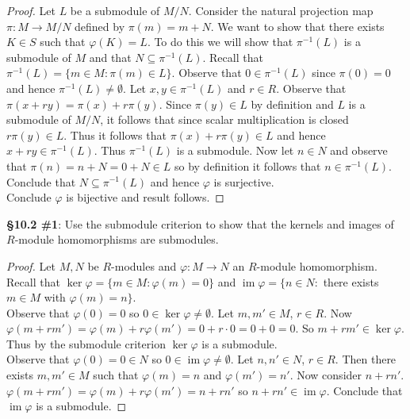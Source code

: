 \documentclass[8pt]{amsart}
\theoremstyle{plain}%
\theoremstyle{definition}
\theoremstyle{remark}
\numberwithin{equation}{section}
\newcommand{\im}{\operatorname{im}}
\begin{document}
\begin{enumerate}
\begin{proof}
				Let $L$ be a submodule of $M/N$. Consider the natural projection map $\pi : M \to M/N$ defined by $\pi(m) = m + N$. We want to show that there exists $K \in S$ such that $\varphi(K) = L$. To do this we will show that $\pi^{-1}(L)$ is a submodule of $M$ and that $N \subseteq \pi^{-1}(L)$. Recall that $\pi^{-1}(L) = \{m \in M : \pi(m) \in L\}$. Observe that $0 \in \pi^{-1}(L)$ since $\pi(0) = 0$ and hence $\pi^{-1}(L) \neq \emptyset$. Let $x, y \in \pi^{-1}(L)$ and $r \in R$. Observe that $\pi(x + ry) = \pi(x) + r \pi(y)$. Since $\pi(y) \in L$ by definition and $L$ is a submodule of $M/N$, it follows that since scalar multiplication is closed $r\pi(y) \in L$. Thus it follows that $\pi(x) + r \pi(y) \in L$ and hence $x + ry \in \pi^{-1}(L)$. Thus $\pi^{-1}(L)$ is a submodule. Now let $n \in N$ and observe that $\pi(n) = n + N = 0 + N \in L$ so by definition it follows that $n \in \pi^{-1}(L)$. Conclude that $N \subseteq \pi^{-1}(L)$ and hence $\varphi$ is surjective.\\

				Conclude $\varphi$ is bijective and result follows.
			\end{proof}
	\end{enumerate}



\textbf{\S 10.2 \#1}: Use the submodule criterion to show that the kernels and images of $R$-module homomorphisms are submodules.
	\begin{proof}
		Let $M, N$ be $R$-modules and $\varphi : M \to N$ an $R$-module homomorphism. Recall that $\ker \varphi = \{m \in M : \varphi(m) = 0\}$ and $\im \varphi = \{n \in N : $ there exists $m \in M$ with $\varphi(m) = n\}$.\\

		Observe that $\varphi(0) = 0$ so $0 \in \ker \varphi \neq \emptyset$. Let $m, m' \in M$, $r \in R$. Now $\varphi(m + rm') = \varphi(m) + r\varphi(m') = 0 + r \cdot 0 = 0 + 0 = 0$. So $m + rm' \in \ker \varphi$. Thus by the submodule criterion $\ker \varphi$ is a submodule.\\

		Observe that $\varphi(0) = 0 \in N$ so $0 \in \im \varphi \neq \emptyset$. Let $n, n' \in N$, $r \in R$. Then there exists $m, m' \in M$ such that $\varphi(m) = n$ and $\varphi(m') = n'$. Now consider $n + rn'$. $\varphi(m + rm') = \varphi(m) + r\varphi(m') = n + rn'$ so $n + rn' \in \im \varphi$. Conclude that $\im \varphi$ is a submodule.
	\end{proof}
\end{document}
